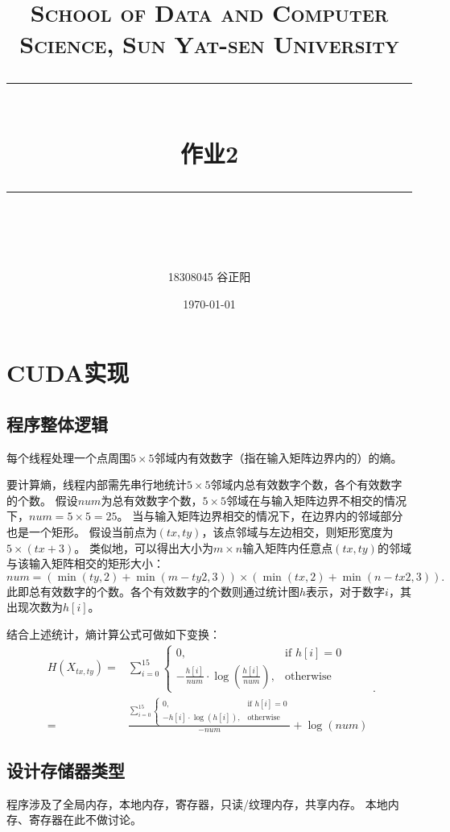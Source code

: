 \documentclass[UTF8, a4paper, 11pt]{article}
\title{	
\normalfont \normalsize
\textsc{School of Data and Computer Science, Sun Yat-sen University} \\ [25pt] %
\rule{\textwidth}{0.5pt} \\[0.4cm] %
\huge 作业2\\ %
\rule{\textwidth}{2pt} \\[0.5cm] %
\author{18308045 谷正阳}
\date{\normalsize\today}
}
\begin{document}
\maketitle
\tableofcontents
\newpage
\section{CUDA实现}
\subsection{程序整体逻辑}
每个线程处理一个点周围$5\times5$邻域内有效数字（指在输入矩阵边界内的）的熵。

要计算熵，线程内部需先串行地统计$5\times5$邻域内总有效数字个数，各个有效数字的个数。
假设$num$为总有效数字个数，$5\times5$邻域在与输入矩阵边界不相交的情况下，$num=5\times5=25$。
当与输入矩阵边界相交的情况下，在边界内的邻域部分也是一个矩形。
假设当前点为$(tx,ty)$，该点邻域与左边相交，则矩形宽度为$5\times(tx+3)$。
类似地，可以得出大小为$m\times n$输入矩阵内任意点$(tx,ty)$的邻域与该输入矩阵相交的矩形大小：
\begin{equation}
    num=(\min(ty,2)+\min(m-ty2,3))\times(\min(tx,2)+\min(n-tx2,3)).
\end{equation}
此即总有效数字的个数。各个有效数字的个数则通过统计图$h$表示，对于数字$i$，其出现次数为$h[i]$。

结合上述统计，熵计算公式可做如下变换：
\begin{equation}
    \begin{aligned}
    H(X_{tx,ty})=&\sum_{i=0}^{15}
    \begin{cases}
        0,&\text{if }h[i]=0\\
        -\frac{h[i]}{num}\cdot\log(\frac{h[i]}{num}),&\text{otherwise}
    \end{cases}\\
    =&\frac{
        \sum_{i=0}^{15}
        \begin{cases}
            0,&\text{if }h[i]=0\\
            -h[i]\cdot\log(h[i]),&\text{otherwise}
        \end{cases}
    }{-num}+\log(num)
    \end{aligned}.
    \label{eq:HX}
\end{equation}
\subsection{设计存储器类型}
程序涉及了全局内存，本地内存，寄存器，只读/纹理内存，共享内存。
本地内存、寄存器在此不做讨论。
\end{document}
